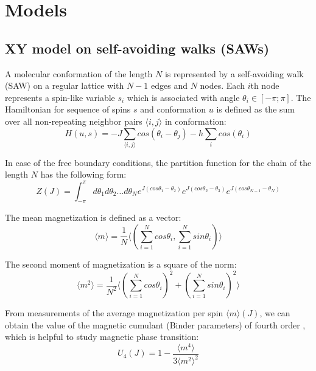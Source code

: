 \chapter{Models} 

\section{XY model on self-avoiding walks (SAWs)} \label{sec:xymodel}

A molecular conformation of the length $N$ is represented by a self-avoiding walk (SAW) on a regular lattice with $N-1$ edges and $N$ nodes.  Each $i$th node represents a spin-like variable $s_i$ which is associated with angle $\theta_i \in  [-\pi;\pi]$. The Hamiltonian for sequence of spins $s$ and conformation $u$ is defined as the sum over all  non-repeating neighbor  pairs $\langle i, j \rangle$ in conformation:
\begin{equation}
\label{hamiltonian}
H(u,s) = -J \sum_{ \langle i, j \rangle } cos(\theta_i - \theta_j) - h \sum_i cos(\theta_i)
\end{equation}

In case of the free boundary conditions, the partition function for the chain of the length $N$ has the following form: 
\begin{equation}
\label{partitionfunction_free}
Z(J) = \int_{-\pi}^{\pi} d \theta_1 d \theta_2 \dots d\theta_N
 e ^{J(cos\theta_1-\theta_2)} e ^{J(cos\theta_2-\theta_3)} 
 e ^{J(cos\theta_{N-1}-\theta_N)} %
\end{equation}

The mean magnetization is defined as a vector:
\begin{equation}
\label{meanmagnetization}
\langle m \rangle = \frac{1}{N} \langle ( \sum_{i=1}^{N} cos \theta_i, \sum_{i=1}^{N} sin \theta_i  ) \rangle
\end{equation}

The second moment of magnetization is a square of the norm:
\begin{equation}
\label{secondmomentmagnetization}
\langle m^2 \rangle = \frac{1}{N^2} \langle ( \sum_{i=1}^{N} cos \theta_i )^2 +  (\sum_{i=1}^{N} sin \theta_i  )^2 \rangle
\end{equation}

From measurements of the average magnetization per spin $\langle m \rangle (J)$, we can obtain the value of the magnetic cumulant  (Binder parameters) of fourth order \cite{Binder2010}, which is helpful to study magnetic phase transition:
\begin{equation}
\label{binderqum}
U_4 (J) = 1 - \frac{ \langle m^4 \rangle}{3 \langle m^2 \rangle^2  }
\end{equation}

